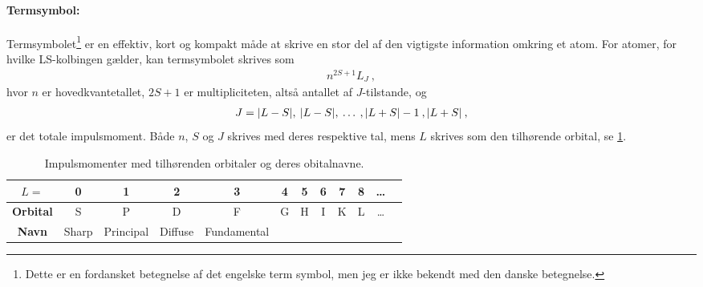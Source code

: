 \paragraph{Termsymbol:} Termsymbolet\footnote{Dette er en fordansket betegnelse af det engelske \textsf{term symbol}, men jeg er ikke bekendt med den danske betegnelse.} er en effektiv, kort og kompakt måde at skrive en stor del af den vigtigste information omkring et atom. For atomer, for hvilke LS-kolbingen gælder, kan termsymbolet skrives som
\begin{align}
    n^{2S+1}L_J \: ,
\end{align}
hvor $n$ er hovedkvantetallet, $2S+1$ er multipliciteten, altså antallet af $J$-tilstande, og
\begin{align}
    J = \abs{L - S}, \: \abs{L - S}, \: \ldots \: , \abs{L + S} - 1 \: , \abs{L + S} \: , 
\end{align}
er det totale impulsmoment. Både $n$, $S$ og $J$ skrives med deres respektive tal, mens $L$ skrives som den tilhørende orbital, se \cref{tab:Q14_ImpulsmomenterOrbitalerOgDeresNavne}.
\begin{table}[!h]
    \centering
    \begin{tabular}{|c|c|c|c|c|c|c|c|c|c|c|c|}
        \hline
        $L=$ & 0 & 1 & 2 & 3 & 4 & 5 & 6 & 7 & 8 & \ldots\\
        \hline
        \textbf{Orbital} & S & P & D & F & G & H & I & K & L & \ldots \\
        \hline
        \textbf{Navn} & Sharp & Principal & Diffuse & Fundamental & & & & & &\\
        \hline
    \end{tabular}
    \caption{Impulsmomenter med tilhørenden orbitaler og deres obitalnavne.}
    \label{tab:Q14_ImpulsmomenterOrbitalerOgDeresNavne}
\end{table}


